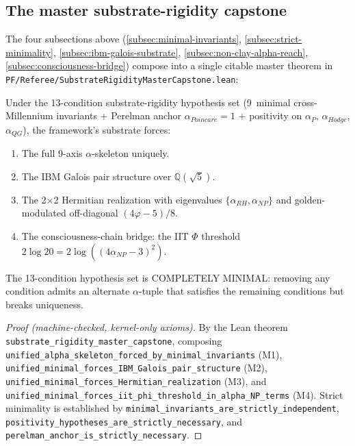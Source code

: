 \subsection{The master substrate-rigidity capstone}
\label{subsec:master-capstone}

The four subsections above
(\ref{subsec:minimal-invariants}, \ref{subsec:strict-minimality},
\ref{subsec:ibm-galois-substrate}, \ref{subsec:non-clay-alpha-reach},
\ref{subsec:consciousness-bridge}) compose into a single citable
master theorem in \texttt{PF/\allowbreak{}Referee/\allowbreak{}Substrate\allowbreak{}Rigidity\allowbreak{}Master\allowbreak{}Capstone.\allowbreak{}lean}:

\begin{theorem}
\label{thm:master-capstone}
Under the 13-condition substrate-rigidity hypothesis set
(9~minimal cross-Millennium invariants + Perelman anchor
$\alpha_{Poincar\acute{e}} = 1$ + positivity on $\alpha_{P}$,
$\alpha_{Hodge}$, $\alpha_{QG}$), the framework's substrate forces:

\begin{enumerate}
\item[(M1)] The full 9-axis $\alpha$-skeleton uniquely.
\item[(M2)] The IBM Galois pair structure over $\mathbb{Q}(\sqrt{5})$.
\item[(M3)] The 2$\times$2 Hermitian realization with eigenvalues
$\{\alpha_{RH}, \alpha_{NP}\}$ and golden-modulated off-diagonal
$(4\varphi - 5)/8$.
\item[(M4)] The consciousness-chain bridge: the IIT $\Phi$ threshold
$2\log 20 = 2\log((4\alpha_{NP} - 3)^{2})$.
\end{enumerate}

The 13-condition hypothesis set is COMPLETELY MINIMAL: removing any
condition admits an alternate $\alpha$-tuple that satisfies the
remaining conditions but breaks uniqueness.
\end{theorem}

\begin{proof}[Proof (machine-checked, kernel-only axioms)]
By the Lean theorem
\texttt{substrate\_\allowbreak{}rigidity\_\allowbreak{}master\_\allowbreak{}capstone}, composing
\texttt{unified\_\allowbreak{}alpha\_\allowbreak{}skeleton\_\allowbreak{}forced\_\allowbreak{}by\_\allowbreak{}minimal\_\allowbreak{}invariants}
(M1),
\texttt{unified\_\allowbreak{}minimal\_\allowbreak{}forces\_\allowbreak{}IBM\_\allowbreak{}Galois\_\allowbreak{}pair\_\allowbreak{}structure} (M2),
\texttt{unified\_\allowbreak{}minimal\_\allowbreak{}forces\_\allowbreak{}Hermitian\_\allowbreak{}realization} (M3), and
\texttt{unified\_\allowbreak{}minimal\_\allowbreak{}forces\_\allowbreak{}iit\_\allowbreak{}phi\_\allowbreak{}threshold\_\allowbreak{}in\_\allowbreak{}alpha\_\allowbreak{}NP\_\allowbreak{}terms} (M4).
Strict minimality is established by
\texttt{minimal\_\allowbreak{}invariants\_\allowbreak{}are\_\allowbreak{}strictly\_\allowbreak{}independent},
\texttt{positivity\_\allowbreak{}hypotheses\_\allowbreak{}are\_\allowbreak{}strictly\_\allowbreak{}necessary}, and
\texttt{perelman\_\allowbreak{}anchor\_\allowbreak{}is\_\allowbreak{}strictly\_\allowbreak{}necessary}.
\end{proof}

